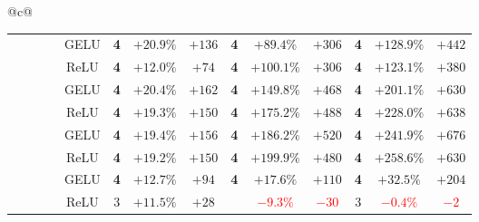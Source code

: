 \begin{tabular}{@{}c@{}}
\begin{tabular}{@{}ccccc|ccccccccc@{}}
\hdashline[1pt/3pt]
\xmark & \cmark & \xmark & \cmark & GELU & \textbf{4} & \textcolor{green!55!black}{$+20.9\%$} & \textcolor{green!55!black}{$+136$} & \textbf{4} & \textcolor{green!55!black}{$+89.4\%$} & \textcolor{green!55!black}{$+306$} & \textbf{4} & \textcolor{green!55!black}{$+128.9\%$} & \textcolor{green!55!black}{$+442$} \\
\xmark & \cmark & \xmark & \cmark & ReLU & \textbf{4} & \textcolor{green!55!black}{$+12.0\%$} & \textcolor{green!55!black}{$+74$} & \textbf{4} & \textcolor{green!55!black}{$+100.1\%$} & \textcolor{green!55!black}{$+306$} & \textbf{4} & \textcolor{green!55!black}{$+123.1\%$} & \textcolor{green!55!black}{$+380$} \\
\hdashline[1pt/3pt]
\xmark & \cmark & \cmark & \xmark & GELU & \textbf{4} & \textcolor{green!55!black}{$+20.4\%$} & \textcolor{green!55!black}{$+162$} & \textbf{4} & \textcolor{green!55!black}{$+149.8\%$} & \textcolor{green!55!black}{$+468$} & \textbf{4} & \textcolor{green!55!black}{$+201.1\%$} & \textcolor{green!55!black}{$+630$} \\
\xmark & \cmark & \cmark & \xmark & ReLU & \textbf{4} & \textcolor{green!55!black}{$+19.3\%$} & \textcolor{green!55!black}{$+150$} & \textbf{4} & \textcolor{green!55!black}{$+175.2\%$} & \textcolor{green!55!black}{$+488$} & \textbf{4} & \textcolor{green!55!black}{$+228.0\%$} & \textcolor{green!55!black}{$+638$} \\
\hdashline[1pt/3pt]
\xmark & \cmark & \cmark & \cmark & GELU & \textbf{4} & \textcolor{green!55!black}{$+19.4\%$} & \textcolor{green!55!black}{$+156$} & \textbf{4} & \textcolor{green!55!black}{$+186.2\%$} & \textcolor{green!55!black}{$+520$} & \textbf{4} & \textcolor{green!55!black}{$+241.9\%$} & \textcolor{green!55!black}{$+676$} \\
\xmark & \cmark & \cmark & \cmark & ReLU & \textbf{4} & \textcolor{green!55!black}{$+19.2\%$} & \textcolor{green!55!black}{$+150$} & \textbf{4} & \textcolor{green!55!black}{$+199.9\%$} & \textcolor{green!55!black}{$+480$} & \textbf{4} & \textcolor{green!55!black}{$+258.6\%$} & \textcolor{green!55!black}{$+630$} \\
\midrule
\cmark & \cmark & \xmark & \xmark & GELU & \textbf{4} & \textcolor{green!55!black}{$+12.7\%$} & \textcolor{green!55!black}{$+94$} & \textbf{4} & \textcolor{green!55!black}{$+17.6\%$} & \textcolor{green!55!black}{$+110$} & \textbf{4} & \textcolor{green!55!black}{$+32.5\%$} & \textcolor{green!55!black}{$+204$} \\
\cmark & \cmark & \xmark & \xmark & ReLU & 3 & \textcolor{green!55!black}{$+11.5\%$} & \textcolor{green!55!black}{$+28$} &  & \textcolor{red}{$-9.3\%$} & \textcolor{red}{$-30$} & 3 & \textcolor{red}{$-0.4\%$} & \textcolor{red}{$-2$} \\

\end{tabular}
\end{tabular}
